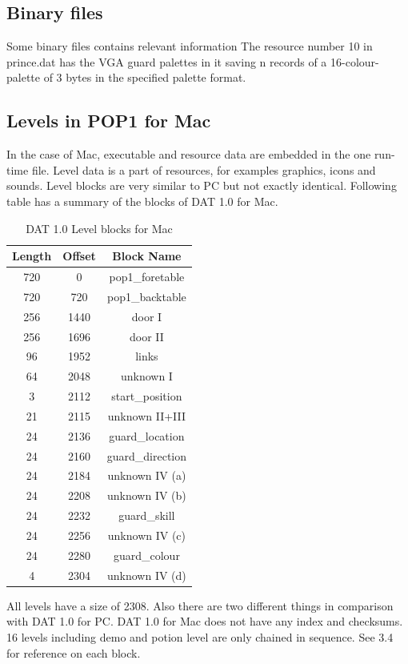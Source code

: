\documentclass{article}
\begin{document}
\subsection{Binary files \label{binary files}}
 Some binary files contains relevant information
 The resource number 10 in prince.dat has the VGA guard palettes in it
 saving n records of a 16-colour-palette of 3 bytes in the specified
 palette format.

\subsection{Levels in POP1 for Mac}
 In the case of Mac, executable and resource data are embedded in the 
 one run-time file. Level data is a part of resources, for examples
 graphics, icons and sounds. Level blocks are very similar to PC but
 not exactly identical. Following table has a summary of the blocks of
 DAT 1.0 for Mac.
 
\begin{table}
\begin{tabular}{ccc}
\hline
 Length& Offset & Block Name \\
\hline
 720   & 0      & pop1\_foretable \\
 720   & 720    & pop1\_backtable \\
 256   & 1440   & door I \\
 256   & 1696   & door II \\
 96    & 1952   & links \\
 64    & 2048   & unknown I \\
 3     & 2112   & start\_position \\
 21    & 2115   & unknown II+III \\
 24    & 2136   & guard\_location \\
 24    & 2160   & guard\_direction \\
 24    & 2184   & unknown IV (a) \\
 24    & 2208   & unknown IV (b) \\
 24    & 2232   & guard\_skill \\
 24    & 2256   & unknown IV (c) \\
 24    & 2280   & guard\_colour \\
 4     & 2304   & unknown IV (d) \\
\hline
\end{tabular}
\caption{DAT 1.0 Level blocks for Mac}
\label{palettes table}
\end{table}

  All levels have a size of 2308. Also there are two different things 
  in comparison with DAT 1.0 for PC. DAT 1.0 for Mac does not have 
  any index and checksums. 16 levels including demo and potion level
  are only chained in sequence. See 3.4 for reference on each block.
\end{document}
